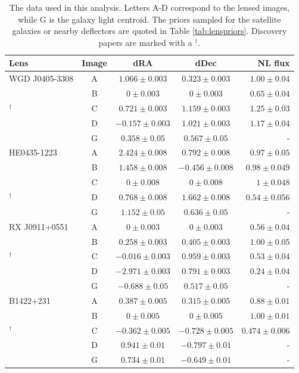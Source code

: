 \begin{table}
	\centering
	\caption[Summary of data]{The data used in this analysis. Letters A-D correspond to the lensed images, while G is the galaxy light centroid. The priors sampled for the satellite galaxies or nearby deflectors are quoted in Table \ref{tab:lenspriors}. Discovery papers are marked with a $^{\dagger}$. }
	\label{tab:datasummary}
	\begin{tabular}{lcccr} %
		\hline
		Lens & Image & dRA & dDec & NL flux \\
		\hline
		WGD J0405-3308 & A & $1.066 \pm 0.003$& $0.323 \pm 0.003$ & $1.00 \pm 0.04$\\
		\citet{Nierenberg++19}& B & $0\pm 0.003$& $0 \pm 0.003$ & $0.65 \pm 0.04$\\
		$^{\dagger}$\citet{Anguita++18}& C & $0.721 \pm 0.003$& $1.159 \pm 0.003$ & $1.25 \pm 0.03$\\
		& D & $-0.157 \pm 0.003$& $1.021 \pm 0.003$ & $1.17 \pm 0.04$ \\
		& G & $0.358 \pm 0.05$ & $0.567 \pm 0.05$ & - \\
		\hline
		HE0435-1223 & A & $2.424 \pm 0.008$& $0.792 \pm 0.008$ & $0.97 \pm 0.05$\\
		\citet{Nierenberg++17}& B & $1.458 \pm 0.008$&$-0.456 \pm 0.008$ & $0.98 \pm 0.049$ \\
		\citet{Wong++17}& C & $0 \pm 0.008$ & $0 \pm 0.008$ &$1 \pm 0.048$ \\
		$^{\dagger}$\citet{Witsotzki++02}& D & $0.768 \pm 0.008$& $1.662 \pm 0.008$ & $0.54 \pm 0.056$\\
		& G & $1.152 \pm 0.05 $&$0.636 \pm 0.05$ &- \\
		\hline
		RX J0911+0551 & A & $0 \pm 0.003$& $0 \pm 0.003$ & $0.56 \pm 0.04$\\
		\citet{Nierenberg++19}& B & $0.258 \pm 0.003$& $0.405 \pm 0.003$ & $1.00 \pm 0.05$\\
		$^{\dagger}$\citep{Bade++97}& C & $-0.016 \pm 0.003$& $0.959 \pm 0.003$ & $0.53 \pm 0.04$\\
		\citet{Blackburne++11}& D  & $-2.971 \pm 0.003$& $0.791 \pm 0.003$ & $0.24 \pm 0.04$\\
		& G  & $-0.688 \pm 0.05$& $0.517 \pm 0.05$ & - \\
		\hline
		B1422+231 & A & $0.387 \pm 0.005$ & $0.315 \pm 0.005$& $0.88 \pm 0.01$\\
		\citet{Nierenberg++14} & B & $0 \pm 0.005$& $0 \pm 0.005$& $1.00 \pm 0.01$\\
		$^{\dagger}$\citet{Patnaik++92}& C & $-0.362 \pm 0.005$ & $-0.728 \pm 0.005$ & $0.474 \pm 0.006$ \\
		& D & $0.941 \pm 0.01$ & $-0.797 \pm 0.01$ & - \\
		& G & $0.734 \pm 0.01$ & $-0.649 \pm 0.01$& - \\ 
		\hline
	\end{tabular}
\end{table}
